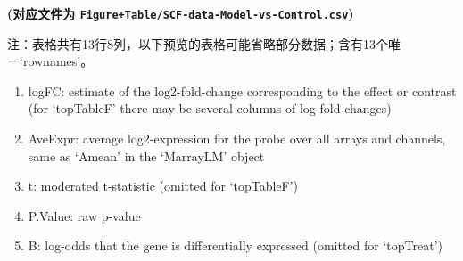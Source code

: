 \documentclass[
]{article}
\providecommand{\tightlist}{%
  \setlength{\itemsep}{0pt}\setlength{\parskip}{0pt}}
\begin{document}
\textbf{(对应文件为 \texttt{Figure+Table/SCF-data-Model-vs-Control.csv})}

\begin{center}\begin{tcolorbox}[colback=gray!10, colframe=gray!50, width=0.9\linewidth, arc=1mm, boxrule=0.5pt]注：表格共有13行8列，以下预览的表格可能省略部分数据；含有13个唯一`rownames'。
\end{tcolorbox}
\end{center}
\begin{center}\begin{tcolorbox}[colback=gray!10, colframe=gray!50, width=0.9\linewidth, arc=1mm, boxrule=0.5pt]\begin{enumerate}\tightlist
\item logFC:  estimate of the log2-fold-change corresponding to the effect or contrast (for ‘topTableF’ there may be several columns of log-fold-changes)
\item AveExpr:  average log2-expression for the probe over all arrays and channels, same as ‘Amean’ in the ‘MarrayLM’ object
\item t:  moderated t-statistic (omitted for ‘topTableF’)
\item P.Value:  raw p-value
\item B:  log-odds that the gene is differentially expressed (omitted for ‘topTreat’)
\end{enumerate}\end{tcolorbox}
\end{center}
\end{document}
